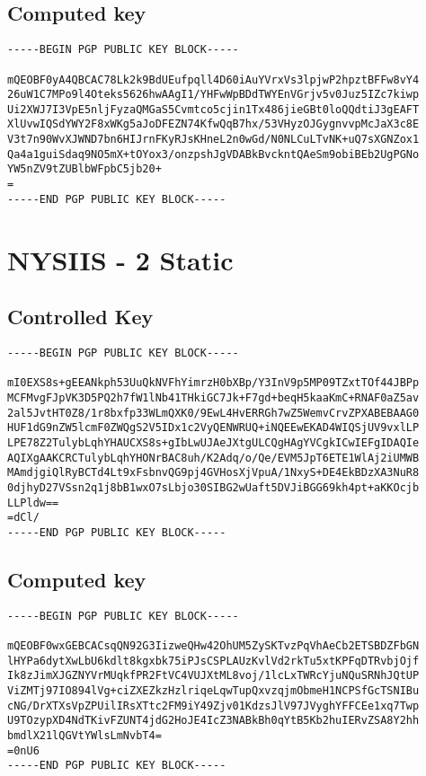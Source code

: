 \subsection{Computed key}
\begin{lstlisting}
-----BEGIN PGP PUBLIC KEY BLOCK-----

mQEOBF0yA4QBCAC78Lk2k9BdUEufpqll4D60iAuYVrxVs3lpjwP2hpztBFFw8vY4
26uW1C7MPo9l4Oteks5626hwAAgI1/YHFwWpBDdTWYEnVGrjv5v0Juz5IZc7kiwp
Ui2XWJ7I3VpE5nljFyzaQMGaS5Cvmtco5cjin1Tx486jieGBt0loQQdtiJ3gEAFT
XlUvwIQSdYWY2F8xWKg5aJoDFEZN74KfwQqB7hx/53VHyzOJGygnvvpMcJaX3c8E
V3t7n90WvXJWND7bn6HIJrnFKyRJsKHneL2n0wGd/N0NLCuLTvNK+uQ7sXGNZox1
Qa4a1guiSdaq9NO5mX+tOYox3/onzpshJgVDABkBvckntQAeSm9obiBEb2UgPGNo
YW5nZV9tZUBlbWFpbC5jb20+
=
-----END PGP PUBLIC KEY BLOCK-----
\end{lstlisting}

\newpage

\section{NYSIIS - 2 Static}
\label{appendix:nysiis_2_static}

\subsection{Controlled Key}
\begin{lstlisting}
-----BEGIN PGP PUBLIC KEY BLOCK-----

mI0EXS8s+gEEANkph53UuQkNVFhYimrzH0bXBp/Y3InV9p5MP09TZxtTOf44JBPp
MCFMvgFJpVK3D5PQ2h7fW1lNb41THkiGC7Jk+F7gd+beqH5kaaKmC+RNAF0aZ5av
2al5JvtHT0Z8/1r8bxfp33WLmQXK0/9EwL4HvERRGh7wZ5WemvCrvZPXABEBAAG0
HUF1dG9nZW5lcmF0ZWQgS2V5IDx1c2VyQENWRUQ+iNQEEwEKAD4WIQSjUV9vxlLP
LPE78Z2TulybLqhYHAUCXS8s+gIbLwUJAeJXtgULCQgHAgYVCgkICwIEFgIDAQIe
AQIXgAAKCRCTulybLqhYHONrBAC8uh/K2Adq/o/Qe/EVM5JpT6ETE1WlAj2iUMWB
MAmdjgiQlRyBCTd4Lt9xFsbnvQG9pj4GVHosXjVpuA/1NxyS+DE4EkBDzXA3NuR8
0djhyD27VSsn2q1j8bB1wxO7sLbjo30SIBG2wUaft5DVJiBGG69kh4pt+aKKOcjb
LLPldw==
=dCl/
-----END PGP PUBLIC KEY BLOCK-----
\end{lstlisting}

\subsection{Computed key}
\begin{lstlisting}
-----BEGIN PGP PUBLIC KEY BLOCK-----

mQEOBF0wxGEBCACsqQN92G3IizweQHw42OhUM5ZySKTvzPqVhAeCb2ETSBDZFbGN
lHYPa6dytXwLbU6kdlt8kgxbk75iPJsCSPLAUzKvlVd2rkTu5xtKPFqDTRvbjOjf
Ik8zJimXJGZNYVrMUqkfPR2FtVC4VUJXtML8voj/1lcLxTWRcYjuNQuSRNhJQtUP
ViZMTj97IO894lVg+ciZXEZkzHzlriqeLqwTupQxvzqjmObmeH1NCPSfGcTSNIBu
cNG/DrXTXsVpZPUilIRsXTtc2FM9iY49Zjv01KdzsJlV97JVyghYFFCEe1xq7Twp
U9TOzypXD4NdTKivFZUNT4jdG2HoJE4IcZ3NABkBh0qYtB5Kb2huIERvZSA8Y2hh
bmdlX21lQGVtYWlsLmNvbT4=
=0nU6
-----END PGP PUBLIC KEY BLOCK-----
\end{lstlisting}